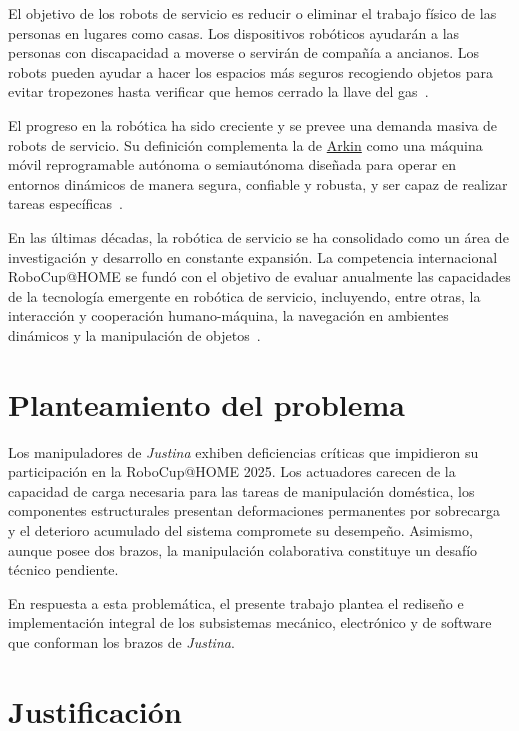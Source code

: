 El objetivo de los robots de servicio es reducir o eliminar el trabajo físico de las personas en lugares como casas. Los dispositivos robóticos ayudarán a las personas con discapacidad a moverse o servirán de compañía a ancianos. Los robots pueden ayudar a hacer los espacios más seguros recogiendo objetos para evitar tropezones hasta verificar que hemos cerrado la llave del gas~\cite{yazmin_robotsServicio}.


El progreso en la robótica ha sido creciente y se prevee una demanda masiva de robots de servicio. Su definición complementa la de \hyperlink{arkin}{Arkin} como una máquina móvil reprogramable autónoma o semiautónoma diseñada para operar en entornos dinámicos de manera segura, confiable y robusta, y ser capaz de realizar tareas específicas~\cite{yazmin_robotsServicio}.

En las últimas décadas, la robótica de servicio se ha consolidado como un área de investigación y desarrollo en constante expansión. La competencia internacional RoboCup@HOME se fundó con el objetivo de evaluar anualmente las capacidades de la tecnología emergente en robótica de servicio, incluyendo, entre otras, la interacción y cooperación humano-máquina, la navegación en ambientes dinámicos y la manipulación de objetos~\cite{robocup_athome}.

\section{Planteamiento del problema}

Los manipuladores de \emph{Justina} exhiben deficiencias críticas que impidieron su participación en la RoboCup@HOME 2025. Los actuadores carecen de la capacidad de carga necesaria para las tareas de manipulación doméstica, los componentes estructurales presentan deformaciones permanentes por sobrecarga y el deterioro acumulado del sistema compromete su desempeño. Asimismo, aunque posee dos brazos, la manipulación colaborativa constituye un desafío técnico pendiente.

En respuesta a esta problemática, el presente trabajo plantea el rediseño e implementación integral de los subsistemas mecánico, electrónico y de software que conforman los brazos de \emph{Justina}.

\section{Justificaci\'on}


